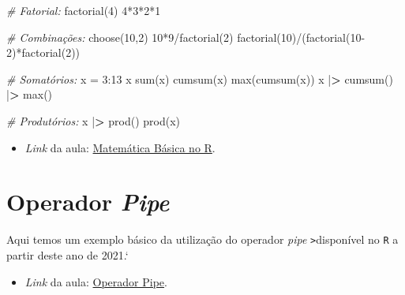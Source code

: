\documentclass[
  12pt,
  brazilian,
]{book}
\newenvironment{Shaded}{\begin{snugshade}}{\end{snugshade}}
\newcommand{\CommentTok}[1]{\textcolor[rgb]{0.56,0.35,0.01}{\textit{#1}}}
\newcommand{\DecValTok}[1]{\textcolor[rgb]{0.00,0.00,0.81}{#1}}
\newcommand{\ErrorTok}[1]{\textcolor[rgb]{0.64,0.00,0.00}{\textbf{#1}}}
\newcommand{\FunctionTok}[1]{\textcolor[rgb]{0.00,0.00,0.00}{#1}}
\newcommand{\NormalTok}[1]{#1}
\newcommand{\OtherTok}[1]{\textcolor[rgb]{0.56,0.35,0.01}{#1}}
\newcommand{\SpecialCharTok}[1]{\textcolor[rgb]{0.00,0.00,0.00}{#1}}
\providecommand{\tightlist}{%
  \setlength{\itemsep}{0pt}\setlength{\parskip}{0pt}}
\begin{document}
\begin{Shaded}
\begin{Highlighting}[]
\CommentTok{\# Fatorial:}
\FunctionTok{factorial}\NormalTok{(}\DecValTok{4}\NormalTok{)}
\DecValTok{4}\SpecialCharTok{*}\DecValTok{3}\SpecialCharTok{*}\DecValTok{2}\SpecialCharTok{*}\DecValTok{1}

\CommentTok{\# Combinações:}
\FunctionTok{choose}\NormalTok{(}\DecValTok{10}\NormalTok{,}\DecValTok{2}\NormalTok{)}
\DecValTok{10}\SpecialCharTok{*}\DecValTok{9}\SpecialCharTok{/}\FunctionTok{factorial}\NormalTok{(}\DecValTok{2}\NormalTok{)}
\FunctionTok{factorial}\NormalTok{(}\DecValTok{10}\NormalTok{)}\SpecialCharTok{/}\NormalTok{(}\FunctionTok{factorial}\NormalTok{(}\DecValTok{10{-}2}\NormalTok{)}\SpecialCharTok{*}\FunctionTok{factorial}\NormalTok{(}\DecValTok{2}\NormalTok{))}

\CommentTok{\# Somatórios:}
\NormalTok{x }\OtherTok{=} \DecValTok{3}\SpecialCharTok{:}\DecValTok{13}
\NormalTok{x}
\FunctionTok{sum}\NormalTok{(x)}
\FunctionTok{cumsum}\NormalTok{(x)}
\FunctionTok{max}\NormalTok{(}\FunctionTok{cumsum}\NormalTok{(x))}
\NormalTok{x }\SpecialCharTok{|}\ErrorTok{\textgreater{}} \FunctionTok{cumsum}\NormalTok{() }\SpecialCharTok{|}\ErrorTok{\textgreater{}} \FunctionTok{max}\NormalTok{()}

\CommentTok{\# Produtórios:}
\NormalTok{x }\SpecialCharTok{|}\ErrorTok{\textgreater{}} \FunctionTok{prod}\NormalTok{()}
\FunctionTok{prod}\NormalTok{(x)}
\end{Highlighting}
\end{Shaded}

\begin{itemize}
\tightlist
\item
  \emph{Link} da aula: \href{https://youtu.be/QDLqS3y5u7Q}{Matemática Básica no R}.
\end{itemize}

\hypertarget{operador-pipe}{%
\section{\texorpdfstring{Operador \emph{Pipe}}{Operador Pipe}}\label{operador-pipe}}

Aqui temos um exemplo básico da utilização do operador \emph{pipe} \texttt{\textbar{}\textgreater{}}disponível no \texttt{R} a partir deste ano de 2021.`

\begin{itemize}
\tightlist
\item
  \emph{Link} da aula: \href{https://youtu.be/n27-lBxdfFg}{Operador Pipe}.
\end{itemize}
\end{document}
